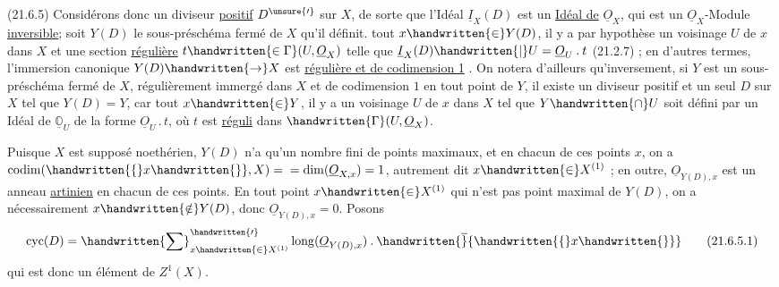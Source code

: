 (21.6.5) Considérons donc un diviseur \uline{positif} $D^{\unsure{\prime}}$ sur $X$, de sorte que l'Idéal  $\underline I_{X}(D)$ est un \uline{Idéal de} $\underline O_{X}$, qui est un $\underline O_{X}$-Module \uline{inversible}; soit $Y(D)$ le sous-préschéma fermé de $X$ qu'il définit.   tout $x\handwritten{\in}Y(D)$,  il y a par hypothèse un voisinage  $U$ de $x$ dans $X$ et une section \uline{régulière} $t\handwritten{\in\Gamma}(U,\underline O_{X})$ telle que $\underline I_{X}(D)\handwritten{\mid}U=\underline O_{U}\mathbin{.}t$ (21.2.7) ; en d'autres termes, l'immersion canonique $Y(D)\handwritten{\to}X$ est \uline{régulière et de codimension 1} . On notera d'ailleurs qu'inversement, si $Y$ \reversemarginpar
est un sous-préschéma fermé de $X$, régulièrement immergé dans $X$ et  de codimension $1$ en tout point de $Y$, il existe un diviseur positif et un seul  $D$ sur $X$ tel que $Y(D)=Y$, car  tout $x\handwritten{\in}Y$, il y a un voisinage $U$ de $x$ dans $X$ tel que $Y\handwritten{\cap}U$ soit défini par un Idéal de $\underline{\mathbb{O}}_{U}$ de la forme $\underline O_{U}\mathbin{.}t$, où $t$ est \uline{réguli} dans $\handwritten{\Gamma}(U,\underline O_{X})$.


Puisque $X$ est supposé noethérien, $Y(D)$ n'a qu'un nombre fini de points maximaux, et en chacun de ces points $x$, on a $\operatorname{codim}(\handwritten{\{}x\handwritten{\}},X)={}\allowbreak{}=\operatorname{dim}(\underline O_{X,x})=1$, autrement dit $x\handwritten{\in}X^{(1)}$ ;
\normalmarginpar
{} en outre, $\underline O_{Y(D),x}$ est un anneau \uline{artinien} en chacun de ces points. En tout point $x\handwritten{\in}X^{(1)}$ qui n'est pas point maximal de $Y(D)$, on a nécessairement $x\handwritten{\notin}Y(D)$, donc $\underline O_{Y(D),x}=0$. Posons
\[
  \operatorname{cyc}(D)=\handwritten{\sum}^{\handwritten{\prime}}_{x\handwritten{\in}X^{(1)}}
  \operatorname{long}(\underline O_{Y(D),x})\mathbin{.}\handwritten{\overline}{\handwritten{\{}x\handwritten{\}}}
  \tag*{(21.6.5.1)}
\]
qui est donc un élément de $Z^{1}(X)$.

